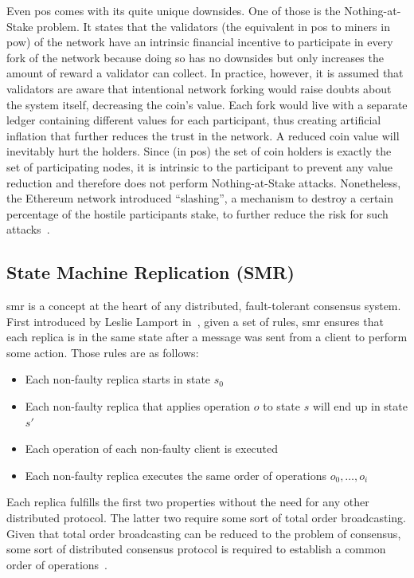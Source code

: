 Even \gls{pos} comes with its quite unique downsides. One of those is the Nothing-at-Stake problem. It states that the validators (the equivalent in \gls{pos} to miners in \gls{pow}) of the network have an intrinsic financial incentive to participate in every fork of the network because doing so has no downsides but only increases the amount of reward a validator can collect. In practice, however, it is assumed that validators are aware that intentional network forking would raise doubts about the system itself, decreasing the coin's value. Each fork would live with a separate ledger containing different values for each participant, thus creating artificial inflation that further reduces the trust in the network. A reduced coin value will inevitably hurt the holders. Since (in \gls{pos}) the set of coin holders is exactly the set of participating nodes, it is intrinsic to the participant to prevent any value reduction and therefore does not perform Nothing-at-Stake attacks. Nonetheless, the Ethereum network introduced ``slashing'', a mechanism to destroy a certain percentage of the hostile participants stake, to further reduce the risk for such attacks~\cite{proof_of_stake}.



\subsection{State Machine Replication (SMR)}
\label{sec:background:blockchain:smr}
\gls{smr} is a concept at the heart of any distributed, fault-tolerant consensus system. First introduced by Leslie Lamport in~\cite{lamport1978}, given a set of rules, \gls{smr} ensures that each replica is in the same state after a message was sent from a client to perform some action. Those rules are as follows:

\begin{itemize}
\item Each non-faulty replica starts in state $s_0$
\item Each non-faulty replica that applies operation $o$ to state $s$ will end up in state $s'$
\item Each operation of each non-faulty client is executed
\item Each non-faulty replica executes the same order of operations $o_0, \ldots, o_i$
\end{itemize}

Each replica fulfills the first two properties without the need for any other distributed protocol. The latter two require some sort of total order broadcasting. Given that total order broadcasting can be reduced to the problem of consensus, some sort of distributed consensus protocol is required to establish a common order of operations~\cite{sousa12from_byzan_consen_bft_state_machin_replic}.



